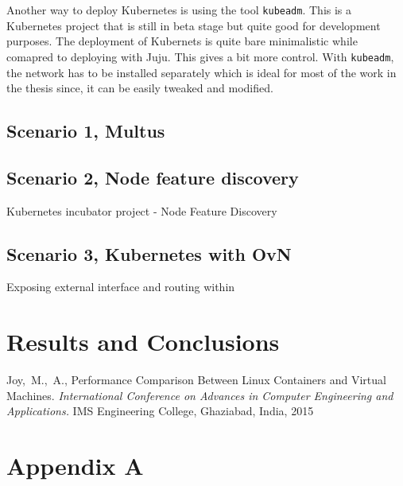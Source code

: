 \documentclass[english, 12pt, a4paper, elec, utf8, a-1b, online]{aaltothesis}
\begin{document}
Another way to deploy Kubernetes is using the tool \lstinline{kubeadm}. This is a Kubernetes project that is still in beta stage but quite good for development purposes. The deployment of Kubernets is quite bare minimalistic while comapred to deploying with Juju. This gives a bit more control. With \lstinline{kubeadm}, the network has to be installed separately which is ideal for most of the work in the thesis since, it can be easily tweaked and modified.


\subsection{Scenario 1, Multus}
\subsection{Scenario 2, Node feature discovery}
Kubernetes incubator project - Node Feature Discovery
\subsection{Scenario 3, Kubernetes with OvN}
Exposing external interface and routing within

\clearpage
\section{Results and Conclusions}

\clearpage
\thesisbibliography
\begin{thebibliography}{99}

 Joy,\ M.,\ A., Performance Comparison Between Linux Containers and Virtual Machines. \textit{International Conference on Advances in Computer Engineering and Applications.} IMS Engineering College, Ghaziabad, India, 2015
\end{thebibliography}

\clearpage
\thesisappendix
\section{Appendix A\label{LiiteA}}
\end{document}
